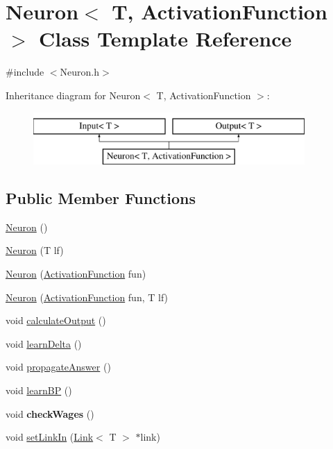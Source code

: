 \hypertarget{class_neuron}{\section{\-Neuron$<$ \-T, \-Activation\-Function $>$ \-Class \-Template \-Reference}
\label{class_neuron}
}


{\ttfamily \#include $<$\-Neuron.\-h$>$}

\-Inheritance diagram for \-Neuron$<$ \-T, \-Activation\-Function $>$\-:\begin{figure}[H]
\begin{center}
\leavevmode
\includegraphics[height=2.000000cm]{class_neuron}
\end{center}
\end{figure}
\subsection*{\-Public \-Member \-Functions}
\begin{DoxyCompactItemize}
\item 
\hyperlink{class_neuron_ada8bb503f1bd56ce2596eabf8c21877e}{\-Neuron} ()
\item 
\hyperlink{class_neuron_a6145b98854c0fb6e9cfe09336952a5dc}{\-Neuron} (\-T lf)
\item 
\hyperlink{class_neuron_afff69f38459625c7d376e5f5e2e34a9d}{\-Neuron} (\hyperlink{class_activation_function}{\-Activation\-Function} fun)
\item 
\hyperlink{class_neuron_a1c7ea1b973546b185e6ec0c29b740453}{\-Neuron} (\hyperlink{class_activation_function}{\-Activation\-Function} fun, \-T lf)
\item 
void \hyperlink{class_neuron_a36c60982cb604f2fa6a1765177a9c2e7}{calculate\-Output} ()
\item 
void \hyperlink{class_neuron_ae73a056c55311521d0e31347837109cc}{learn\-Delta} ()
\item 
void \hyperlink{class_neuron_acb55ff03a770877b6afb86ed4d06896a}{propagate\-Answer} ()
\item 
void \hyperlink{class_neuron_a5e479fce295d76be68c017ab8c986f8c}{learn\-B\-P} ()
\item 
\hypertarget{class_neuron_a7ab012ac0a6a20b474b6147fcdc6ea2d}{void {\bfseries check\-Wages} ()}\label{class_neuron_a7ab012ac0a6a20b474b6147fcdc6ea2d}

\item 
void \hyperlink{class_neuron_a1a20d9ac9bf64126f8d74d8c1c7d3c58}{set\-Link\-In} (\hyperlink{class_link}{\-Link}$<$ \-T $>$ $\ast$link)
\end{DoxyCompactItemize}


